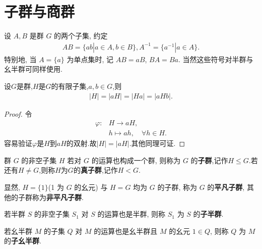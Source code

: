 \documentclass[../../main.tex]{subfiles}%
\begin{document}
\section{子群与商群}

\begin{definition}
设 \( A, B \) 是群 \( G \) 的两个子集, 约定
\begin{align*}
AB = \{ab|a \in A, b \in B\} , A^{-1} = \{a^{-1}|a \in A\}.
\end{align*}
特别地, 当 \( A = \{a\} \) 为单点集时, 记 \( AB = aB \), \( BA = Ba \). 当然这些符号对半群与幺半群可同样使用.
\end{definition}

\begin{proposition}\label{proposition:有限群乘积的阶}
设$G$是群,$H$是$G$的有限子集,$a,b\in G$,则
\begin{align*}
|H|=|aH| = |Ha| = |aHb| .
\end{align*}
\end{proposition}
\begin{proof}
令
\begin{align*}
\varphi : &H \longrightarrow aH, \\
&h \longmapsto ah,\quad \forall h \in H.
\end{align*}
容易验证$\varphi$是$H$到$aH$的双射.故$|H|=|aH|$.其他同理可证.
\end{proof}

\begin{definition}
群 \( G \) 的非空子集 \( H \) 若对 \( G \) 的运算也构成一个群, 则称为 \( G \) 的\textbf{子群},记作$H\leqslant G$.若还有$H\neq G$,则称$H$为$G$的\textbf{真子群},记作$H<G$.
\end{definition}
\begin{remark}
显然, \( H = \{1\} \)(1 为 \( G \) 的幺元) 与 \( H = G \) 均为 \( G \) 的子群, 称为 \( G \) 的\textbf{平凡子群}, 其他的子群称为\textbf{非平凡子群}.
\end{remark}

\begin{definition}
若半群 \( S \) 的非空子集 \( S_1 \) 对 \( S \) 的运算也是半群, 则称 \( S_1 \) 为 \( S \) 的\textbf{子半群}.

若幺半群 \( M \) 的子集 \( Q \) 对 \( M \) 的运算也是幺半群且 \( M \) 的幺元 \( 1 \in Q \), 则称 \( Q \) 为 \( M \) 的\textbf{子幺半群}.
\end{definition}
\end{document}
